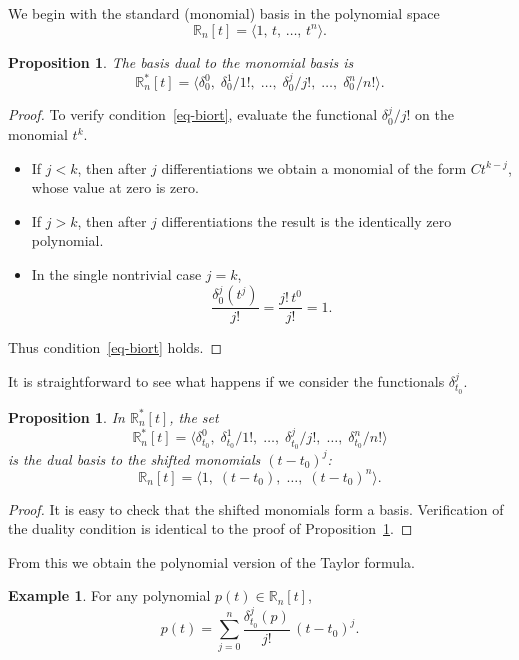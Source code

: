 \documentclass{article}
\newtheorem{proposition}[theorem]{Proposition}	%
\theoremstyle{definition}
\newtheorem{example}[theorem]{Example}
\theoremstyle{definition}
\numberwithin{figure}{section}
\newcommand{\1}{\mathbf{1}}
\begin{document}
We begin with the standard (monomial) basis in the polynomial space
\[
    \mathbb{R}_n[t] = \langle 1,\, t,\, \ldots,\, t^n \rangle.
\]

\begin{proposition}\label{prop-monombas}
The basis dual to the monomial basis is
\[
    \mathbb{R}_n^*[t] = \langle \delta^0_0,\; \delta^1_0/1!,\; \ldots,\; \delta_0^j/j!,\; \ldots,\; \delta_0^n/n! \rangle.
\]
\end{proposition}

\begin{proof}
To verify condition~\eqref{eq-biort}, evaluate the functional $\delta_0^j/j!$ on the monomial $t^k$.

\begin{itemize}
    \item If $j < k$, then after $j$ differentiations we obtain a monomial of the form $C t^{k-j}$, whose value at zero is zero.
    \item If $j > k$, then after $j$ differentiations the result is the identically zero polynomial.
    \item In the single nontrivial case $j = k$,
    \[
        \frac{\delta_0^j(t^j)}{j!}
        = \frac{j! \, t^0}{j!}
        = 1.
    \]
\end{itemize}

Thus condition~\eqref{eq-biort} holds.
\end{proof}

It is straightforward to see what happens if we consider the functionals $\delta^j_{t_0}$.

\begin{proposition}
In $\mathbb{R}_n^*[t]$, the set
\[
    \mathbb{R}_n^*[t] = \langle \delta^0_{t_0},\; \delta^1_{t_0}/1!,\; \ldots,\; \delta^j_{t_0}/j!,\; \ldots,\; \delta^n_{t_0}/n! \rangle
\]
is the dual basis to the shifted monomials $(t - t_0)^j$:
\[
    \mathbb{R}_n[t] = \langle 1,\; (t - t_0),\; \ldots,\; (t - t_0)^n \rangle.
\]
\end{proposition}

\begin{proof}
It is easy to check that the shifted monomials form a basis. Verification of the duality condition is identical to the proof of Proposition~\ref{prop-monombas}.
\end{proof}

From this we obtain the polynomial version of the Taylor formula.

\begin{example}\label{prop-polnR}
For any polynomial \(p(t) \in \mathbb{R}_n[t]\),
\[
    p(t) = \sum_{j=0}^{n} \frac{\delta^j_{t_0}(p)}{j!}\, (t - t_0)^j.
\]
\end{example}
\end{document}
